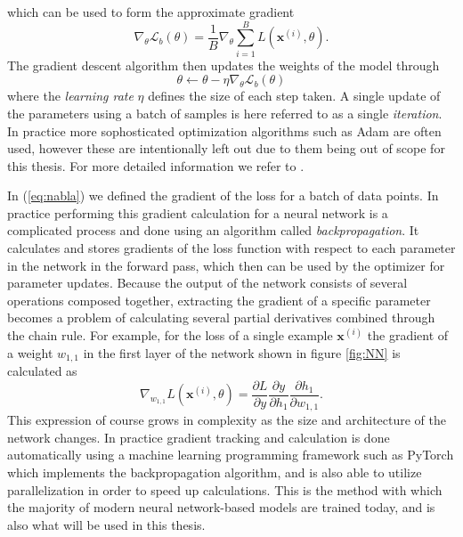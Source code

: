 \documentclass{report}
\begin{document}
which can be used to form the approximate gradient
\begin{equation} \label{eq:nabla}
    \nabla_{\theta} \mathcal{L}_b(\theta) = \frac{1}{B} \nabla_{\theta} \sum_{i=1}^B L(\bm{x}^{(i)}, \theta).
\end{equation}
The gradient descent algorithm then updates the weights of the model through
\begin{equation}
    \theta \leftarrow \theta - \eta \nabla_{\theta} \mathcal{L}_b(\theta)
\end{equation}
where the \textit{learning rate} $\eta$ defines the size of each step taken. A single update of the parameters using a batch of samples is here referred to as a single \textit{iteration}. In practice more sophosticated optimization algorithms such as Adam are often used, however these are intentionally left out due to them being out of scope for this thesis. For more detailed information we refer to \cite{kingma2014adam, ruder2016overview}.

In (\ref{eq:nabla}) we defined the gradient of the loss for a batch of data points. In practice performing this gradient calculation for a neural network is a complicated process and done using an algorithm called \textit{backpropagation}. It calculates and stores gradients of the loss function with respect to each parameter in the network in the forward pass, which then can be used by the optimizer for parameter updates. Because the output of the network consists of several operations composed together, extracting the gradient of a specific parameter becomes a problem of calculating several partial derivatives combined through the chain rule. For example, for the loss of a single example $\bm{x}^{(i)}$ the gradient of a weight $w_{1,1}$ in the first layer of the network shown in figure \ref{fig:NN} is calculated as
\begin{equation}
    \nabla_{w_{1,1}} L(\bm{x}^{(i)}, \theta) = \frac{\partial L}{\partial y} \frac{\partial y}{\partial h_1} \frac{\partial h_1}{\partial w_{1,1}}.
\end{equation}
This expression of course grows in complexity as the size and architecture of the network changes. In practice gradient tracking and calculation is done automatically using a machine learning programming framework such as PyTorch \cite{paszke2019pytorch} which implements the backpropagation algorithm, and is also able to utilize parallelization in order to speed up calculations. This is the method with which the majority of modern neural network-based models are trained today, and is also what will be used in this thesis.
\end{document}
